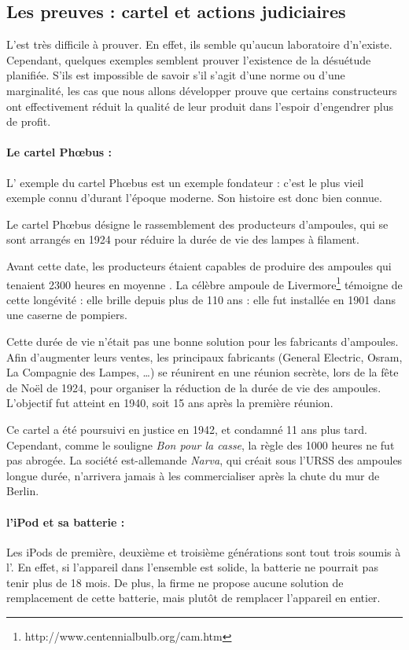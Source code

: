 \subsection{Les preuves : cartel et actions judiciaires}
\label{c1/s1/ss1:preuve_op}

L'\op est très difficile à prouver. En effet, ils semble qu'aucun laboratoire d'\op n'existe. Cependant, quelques exemples semblent prouver l'existence de la désuétude planifiée. S'ils est impossible de savoir s'il s'agit d'une norme ou d'une marginalité, les cas que nous allons développer prouve que certains constructeurs ont effectivement réduit la qualité de leur produit dans l'espoir d'engendrer plus de profit. 

\paragraph*{Le cartel Phœbus : } L' exemple du cartel Phœbus est un exemple fondateur : c'est le plus vieil exemple connu d'\op durant l'époque moderne. Son histoire est donc bien connue. 

Le cartel Phœbus désigne le rassemblement des producteurs d'ampoules, qui se sont arrangés en 1924 pour réduire la durée de vie des lampes à filament. 

Avant cette date, les producteurs étaient capables de produire des ampoules qui tenaient 2300 heures en moyenne \cite{opes_PHOEBUS}. La célèbre ampoule de Livermore\footnote{http://www.centennialbulb.org/cam.htm} témoigne de cette longévité : elle brille depuis plus de 110 ans : elle fut installée en 1901 dans une caserne de pompiers. 

Cette durée de vie n'était pas une bonne solution pour les fabricants d'ampoules. Afin d'augmenter leurs ventes, les principaux fabricants (General Electric, Osram, La Compagnie des Lampes, \dots) se réunirent en une réunion secrète, lors de la fête de Noël de 1924, pour organiser la  réduction de la durée de vie des ampoules. L'objectif fut atteint  en 1940, soit 15 ans après la première réunion. 

Ce cartel a été poursuivi en justice en 1942, et condamné 11 ans plus tard. Cependant, comme le souligne \textit{Bon pour la casse}, la règle des 1000 heures ne fut pas abrogée. La société est-allemande \textit{Narva}, qui créait sous l'URSS des ampoules longue durée, n'arrivera jamais à les commercialiser après la chute du mur de Berlin. 

\paragraph*{l'iPod et sa batterie : } Les iPods de première, deuxième et troisième générations sont tout trois soumis à l'\op. En effet, si l'appareil dans l'ensemble est solide, la batterie ne pourrait pas tenir plus de 18 mois\cite{cec-zevRapportObsProg}. De plus, la firme ne propose aucune solution de remplacement de cette batterie, mais plutôt de remplacer l'appareil en entier. 

